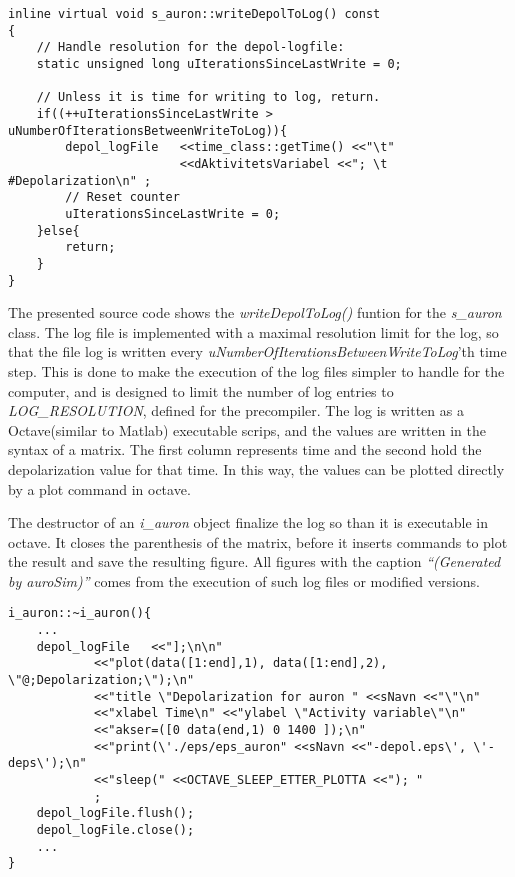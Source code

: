 \begin{lstlisting}
inline virtual void s_auron::writeDepolToLog() const 
{
	// Handle resolution for the depol-logfile:
	static unsigned long uIterationsSinceLastWrite = 0;

	// Unless it is time for writing to log, return.
	if((++uIterationsSinceLastWrite > uNumberOfIterationsBetweenWriteToLog)){
		depol_logFile 	<<time_class::getTime() <<"\t" 
						<<dAktivitetsVariabel <<"; \t #Depolarization\n" ;
		// Reset counter
		uIterationsSinceLastWrite = 0;
	}else{
		return;
	}
}
\end{lstlisting}
			
			The presented source code shows the \emph{writeDepolToLog()} funtion for the \emph{s\_auron} class.
			The log file is implemented with a maximal resolution limit for the log, so that the file log is written every \emph{uNumberOfIterationsBetweenWriteToLog}'th time step.
			This is done to make the execution of the log files simpler to handle for the computer, and is designed to limit the number of log entries to \emph{LOG\_RESOLUTION}, defined for the precompiler.
			The log is written as a Octave(similar to Matlab) executable scrips, and the values are written in the syntax of a matrix.
			The first column represents time and the second hold the depolarization value for that time. 
			In this way, the values can be plotted directly by a plot command in octave.

			The destructor of an \emph{i\_auron} object finalize the log so than it is executable in octave.
			It closes the parenthesis of the matrix, before it inserts commands to plot the result and save the resulting figure.
			All figures with the caption \emph{``(Generated by \emph{auroSim})''} comes from the execution of such log files or modified versions.
\begin{lstlisting}
i_auron::~i_auron(){
	...
	depol_logFile 	<<"];\n\n"
			<<"plot(data([1:end],1), data([1:end],2), \"@;Depolarization;\");\n"
			<<"title \"Depolarization for auron " <<sNavn <<"\"\n"
			<<"xlabel Time\n" <<"ylabel \"Activity variable\"\n"
			<<"akser=([0 data(end,1) 0 1400 ]);\n"
			<<"print(\'./eps/eps_auron" <<sNavn <<"-depol.eps\', \'-deps\');\n"
			<<"sleep(" <<OCTAVE_SLEEP_ETTER_PLOTTA <<"); "
			;
	depol_logFile.flush();
	depol_logFile.close();
	...
}
\end{lstlisting}
			
